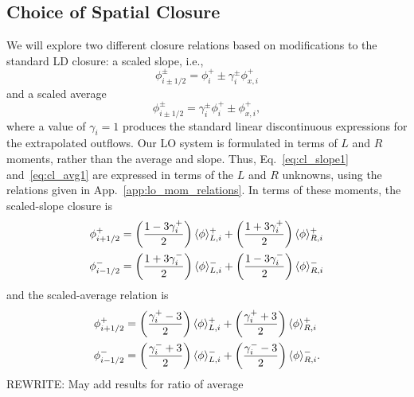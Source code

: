 \subsection{Choice of Spatial Closure}
\label{sec:spat_clos_options}

We will
explore two different closure relations based on modifications to the standard LD closure: a scaled slope, i.e.,
\begin{equation}\label{eq:cl_slope1}
    \phi_{i\pm1/2}^\pm = \phi_i^+ \pm \gamma_i^{\pm} \phi_{x,i}^+
\end{equation}
and a scaled average
\begin{equation}\label{eq:cl_avg1}
    \phi_{i\pm1/2}^\pm = \gamma_i^{\pm} \phi_i^+ \pm \phi_{x,i}^+,
\end{equation}
where a value of $\gamma_i = 1$ produces the standard linear discontinuous expressions for
the extrapolated outflows.  Our LO system is formulated in terms of $L$ and $R$ moments, rather than the average and
slope.  Thus, Eq.~\eqref{eq:cl_slope1} and~\eqref{eq:cl_avg1} are expressed in terms of the $L$ and $R$
unknowns, using the relations given in App.~\ref{app:lo_mom_relations}.  In terms of these
moments, the scaled-slope closure is
\begin{align}\label{eq:cl_slope}
    \phi_{i+1/2}^+  &= \left(\frac{\displaystyle 1 - 3 \gamma_i^+}{\displaystyle 2 }  \right)
    \langle \phi \rangle_{L,i}^+ + \left(\frac{\displaystyle 1 + 3 \gamma_i^+}{\displaystyle 2 }  \right)
    \langle \phi \rangle_{R,i}^+ \\
    \phi_{i-1/2}^-  &= \left(\frac{\displaystyle 1 + 3 \gamma_i^-}{\displaystyle 2 }  \right)
    \langle \phi \rangle_{L,i}^- + \left(\frac{\displaystyle 1 - 3 \gamma_i^-}{\displaystyle 2 }  \right)
    \langle \phi \rangle_{R,i}^- 
\end{align}
and the scaled-average relation is
\begin{align}\label{eq:cl_avg}
    \phi_{i+1/2}^+  &= \left(\frac{\displaystyle  \gamma_i^+ - 3}{\displaystyle 2 }  \right)
    \langle \phi \rangle_{L,i}^+ + \left(\frac{\displaystyle \gamma_i^+ + 3}{\displaystyle 2 }  \right)
    \langle \phi \rangle_{R,i}^+ \\
    \phi_{i-1/2}^-  &= \left(\frac{\displaystyle \gamma_i^- + 3}{\displaystyle 2 }  \right)
    \langle \phi \rangle_{L,i}^- + \left(\frac{\displaystyle \gamma_i^- - 3}{\displaystyle 2 }  \right)
    \langle \phi \rangle_{R,i}^- .
\end{align}
REWRITE: May add results for ratio of average

